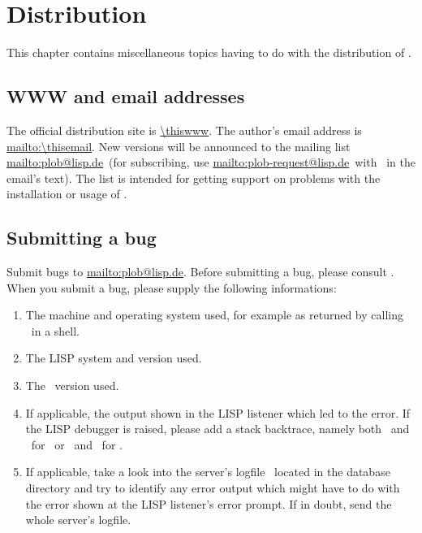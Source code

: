 
\chapter{Distribution}

This chapter contains miscellaneous topics having to do with the
distribution of \plobwoexcl.

{\section{WWW and email addresses}}%
\label{sec:ContactAddress}

The official distribution site is \url{\thiswww}.  The author's email
address is \url{mailto:\thisemail}.  New versions will be announced to
the mailing list \url{mailto:plob@lisp.de}\ (for subscribing, use
\url{mailto:plob-request@lisp.de}\ with \ in the
email's text). The list is intended for getting support on problems
with the installation or usage of \plobwoexcl.

{\section{Submitting a bug}}%
\label{sec:BugSubmit}

Submit bugs to \url{mailto:plob@lisp.de}. Before submitting a bug,
please consult . When you
submit a bug, please supply the following informations:

\begin{enumerate}

\item The machine and operating system used, for example as returned
  by calling \ in a shell.

\item The LISP system and version used.

\item The \plob\ version used.

\item If applicable, the output shown in the LISP listener which led
  to the error. If the LISP debugger is raised, please add a stack
  backtrace, namely both \ and \ for \allegrocl\ 
  or \ and \ for \lwcl.

\item If applicable, take a look into the server's logfile
  \ located in the database directory and try to
  identify any error output which might have to do with the error
  shown at the LISP listener's error prompt. If in doubt, send the
  whole server's logfile.

\end{enumerate}

